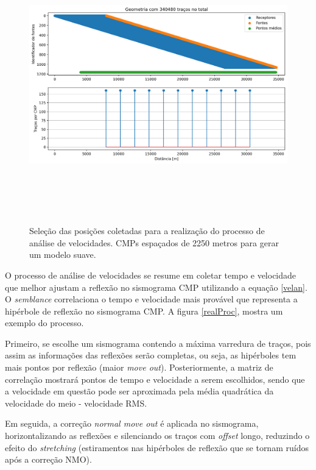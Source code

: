 \documentclass[
	12pt,				%
	openright,			%
	oneside,			%
	a4paper,			%
	english,			%
	brazil				%
	]{abntex2}
\begin{document}
    \begin{figure}[htp!]
		\centering
		\includegraphics[width=16cm,height=12cm]{../imagens/cmpTraceCountVelAn.png}
		\caption{Seleção das posições coletadas para a realização do processo de análise de velocidades. CMPs espaçados de 2250 metros para gerar um modelo suave.}
		\label{cmpVelAn}
	\end{figure}

	O processo de análise de velocidades se resume em coletar tempo e velocidade que melhor ajustam a reflexão no sismograma CMP utilizando a equação \ref{velan}. O \textit{semblance} correlaciona o tempo e velocidade mais provável que representa a hipérbole de reflexão no sismograma CMP. A figura \ref{realProc}, mostra um exemplo do processo. 

	Primeiro, se escolhe um sismograma contendo a máxima varredura de traços, pois assim as informações das reflexões serão completas, ou seja, as hipérboles tem mais pontos por reflexão (maior \textit{move out}). Posteriormente, a matriz de correlação mostrará pontos de tempo e velocidade a serem escolhidos, sendo que a velocidade em questão pode ser aproximada pela média quadrática da velocidade do meio - velocidade RMS. 
	
	Em seguida, a correção \textit{normal move out} é aplicada no sismograma, horizontalizando as reflexões e silenciando os traços com \textit{offset} longo, reduzindo o efeito do \textit{stretching} (estiramentos nas hipérboles de reflexão que se tornam ruídos após a correção NMO). 
	
\end{document}
